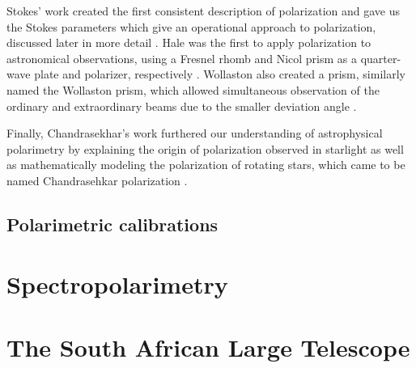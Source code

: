 Stokes' work created the first consistent description of polarization and gave us the Stokes parameters which give an operational approach to polarization, discussed later in more detail \citep{Stokes}. Hale was the first to apply polarization to astronomical observations, using a Fresnel rhomb and Nicol prism as a quarter-wave plate and polarizer, respectively \citep{Hale_pre,Hale_post}. Wollaston also created a prism, similarly named the Wollaston prism, which allowed simultaneous observation of the ordinary and extraordinary beams due to the smaller deviation angle \citep{WollPrism}.
\prgph

Finally, Chandrasekhar's work furthered our understanding of astrophysical polarimetry by explaining the origin of polarization observed in starlight as well as mathematically modeling the polarization of rotating stars, which came to be named Chandrasehkar polarization \citep{chandrasekhar}.







\subsection{Polarimetric calibrations}



\section{Spectropolarimetry} %







\section{The South African Large Telescope} %

